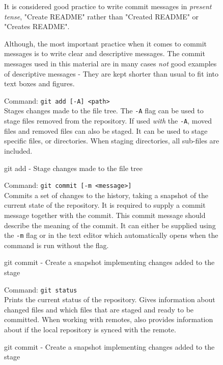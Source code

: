 \documentclass[../main/git_course_main.tex]{subfiles}
\begin{document}
	\begin{figure}[h!]
		\begin{redbox}
			It is considered good practice to write commit messages in \textit{present tense},
			"Create README" rather than "Created README" or "Creates README".
			
			Although, the most important practice when it comes to commit messages is to write
			clear and descriptive messages. The commit messages used in this material are in
			many cases \textit{not} good examples of descriptive messages - They are kept shorter than usual to fit into text boxes and figures.
		\end{redbox}
	\end{figure}
	
	\begin{figure}[h!]
		\begin{bluebox}
			Command: \verb$git add [-A] <path>$ \\
			
			Stages changes made to the file tree. The \verb$-A$ flag can be used to stage files removed from the repository.
			If used \textit{with} the \verb$-A$, moved files and removed files can also be staged.
			It can be used to stage specific files, or directories. When staging directories, all sub-files are
			included.
		\end{bluebox}
		\label{command:add}
		\caption{git add - Stage changes made to the file tree}
	\end{figure}
	
	\begin{figure}[h!]
		\begin{bluebox}
			Command: \verb$git commit [-m <message>]$ \\
			
			Commits a set of changes to the history, taking a snapshot of the current state of the repository.
			It is required to supply a commit message together with the commit. This commit message should describe the meaning of the commit. It can either be supplied using the \verb$-m$ flag or in the text editor which automatically opens when the command is run without the flag. 
		\end{bluebox}
		\label{command:commit}
		\caption{git commit - Create a snapshot implementing changes added to the stage}
	\end{figure}
	
	\begin{figure}[h!]
		\begin{bluebox}
			Command: \verb$git status$ \\
			
			Prints the current status of the repository. Gives information about changed files
			and which files that are staged and ready to be committed. When working with remotes,
			also provides information about if the local repository is synced with the remote.
		\end{bluebox}
		\label{command:commit}
		\caption{git commit - Create a snapshot implementing changes added to the stage}
	\end{figure}
	
\end{document}
